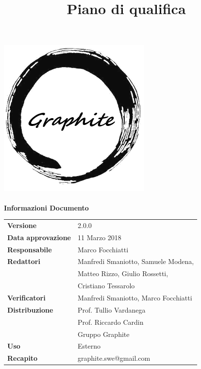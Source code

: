 \documentclass[openany,12pt,a4paper]{report}
\title{Piano di qualifica}
\author{}
\newcommand{\versione}{2.0.0}
\begin{document}
	\makeatletter
	\begin{titlepage}
		\setlength{\headsep}{0pt}  
		\begin{center}
			\includegraphics[width=0.5\linewidth]{img/logo.png}\\[1em]
			{\huge \bfseries  \@title }\\[10ex]
			\textbf{\Large Informazioni Documento} \\[2em]
			\bgroup
			\def\arraystretch{1.5}
			\begin{tabular}{l|l}
				\textbf{Versione} & \versione{} \\
				\textbf{Data approvazione} & 11 Marzo 2018 \\
				\textbf{Responsabile} & Marco Focchiatti\\
				\textbf{Redattori} &  Manfredi Smaniotto, Samuele Modena,\\
				& Matteo Rizzo, Giulio Rossetti, \\
				& Cristiano Tessarolo \\
				\textbf{Verificatori} & Manfredi Smaniotto, Marco Focchiatti \\
				\textbf{Distribuzione} & Prof. Tullio Vardanega \\
				 & Prof. Riccardo Cardin \\
				 & Gruppo Graphite \\
				\textbf{Uso} & Esterno \\
				\textbf{Recapito} & graphite.swe@gmail.com \\
			\end{tabular}
		\egroup
		\end{center}
	\end{titlepage}
	\makeatother
 
\thispagestyle{empty}
\newpage

\end{document}
